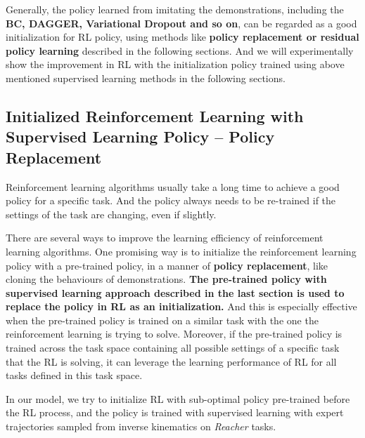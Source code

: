 \documentclass{article}
\begin{document}
Generally, the policy learned from imitating the demonstrations, including the \textbf{BC, DAGGER, Variational Dropout and so on},  can be regarded as a good initialization for RL policy, using methods like \textbf{policy replacement or residual policy learning} described in the following sections. And we will experimentally show the improvement in RL with the initialization policy trained using above mentioned supervised learning methods in the following sections.

\subsection{Initialized Reinforcement Learning with Supervised Learning Policy -- Policy Replacement}

Reinforcement learning algorithms usually take a long time to achieve a good policy for a specific task. And the policy always needs to be re-trained if the settings of the task are changing, even if slightly. 

There are several ways to improve the learning efficiency of reinforcement learning algorithms. One promising way is to initialize the reinforcement learning policy with a pre-trained policy, in a manner of \textbf{policy replacement}, like cloning the behaviours of demonstrations. \textbf{The pre-trained policy with supervised learning approach described in the last section is used to replace the policy in RL as an initialization.} And this is especially effective when the pre-trained policy is trained on a similar task with the one the reinforcement learning is trying to solve. Moreover, if the pre-trained policy is trained across the task space containing all possible settings of a specific task that the RL is solving, it can leverage the learning performance of RL for all tasks defined in this task space.

In our model, we try to initialize RL with sub-optimal policy pre-trained before the RL process, and the policy is trained with supervised learning with expert trajectories sampled from inverse kinematics on \textit{Reacher} tasks. 
\end{document}
